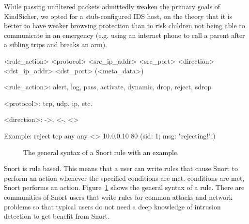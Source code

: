 While passing unfiltered packets admittedly weaken the primary goals of
KindSicher, we opted for a stub-configured IDS host, on the theory that it is
better to have weaker browsing protection than to risk children not being able
to communicate in an emergency (e.g. using an internet phone to call a parent
after a sibling trips and breaks an arm).




\begin{verbbox}
<rule_action> <protocol>
    <src_ip_addr> <src_port>
    <direction>
    <dst_ip_addr> <dst_port>
    (<meta_data>)


<rule_action>: alert, log, pass, activate,
    dynamic, drop, reject, sdrop

<protocol>: tcp, udp, ip, etc.

<direction>: ->, <-, <>

Example:
reject tcp
    any any
    <>
    10.0.0.10 80
    (sid: 1; msg: "rejecting!";)

\end{verbbox}

\begin{figure}[!t]
    \centering
    \theverbbox
    \caption{The general syntax of a Snort rule with an example.}
    \label{fig:rule_syntax}
\end{figure}

Snort is rule based. 
%
This means that a user can write rules that cause Snort to perform an action
whenever the specified conditions are met.  conditions are met, Snort performs
an action.
%
Figure~\ref{fig:rule_syntax} shows the general syntax of a rule. There are
communities of Snort users that write rules for common attacks and network
problems so that typical users do not need a deep knowledge of intrusion
detection to get benefit from Snort.


